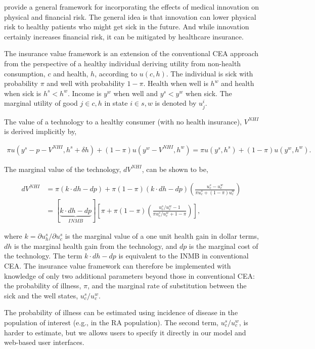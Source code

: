 \documentclass[11pt,final,fleqn]{article}\usepackage[]{graphicx}\usepackage[]{color}
\theoremstyle{plain}
\begin{document}
\citet{lakdawalla2017insurance} provide a general framework for incorporating the effects of medical innovation on physical and financial risk. The general idea is that innovation can lower physical risk to healthy patients who might get sick in the future. And while innovation certainly increases financial risk, it can be mitigated by healthcare insurance.  

The insurance value framework is an extension of the conventional CEA approach from the perspective of a healthy individual deriving utility from non-health consumption, $c$ and health, $h$, according to $u(c,h)$. The individual is sick with probability $\pi$ and well with probability $1-\pi$.  Health when well is $h^w$ and health when sick is $h^s < h^w$. Income is $y^w$ when well and $y^s <y^w$ when sick. The marginal utility of good $j \in {c,h}$ in state $i \in {s,w}$ is denoted by $u_j^i$. 

The value of a technology to a healthy consumer (with no health insurance), $V^{NHI}$ is derived implicitly by,

\begin{align}
\pi u(y^s - p - V^{NHI}, h^s + \delta h) + (1 - \pi)u\left(y^w - V^{NHI}, h^w \right) = 
\pi u(y^s, h^s) + (1-\pi) u(y^w, h^w).
\end{align}

The marginal value of the technology, $dV^{NHI}$, can be shown to be,

\begin{align}
dV^{NHI} &= \pi (k \cdot dh - dp) + \pi (1 - \pi)(k \cdot dh - dp)\left(\frac{u_c^s - u_c^w}{\pi u_c^s + (1-\pi)u_c^w} \right) \\
&= \left[\underbrace{k \cdot dh - dp}_{INMB}\right] \left[\pi + \pi (1 - \pi)\left(\frac{u_c^s/u_c^w - 1}{\pi u_c^s/u_c^w + 1 - \pi}\right)\right],
\end{align}

where $k = \partial u_h^s/\partial u_c^s$ is the marginal value of a one unit health gain in dollar terms, $dh$ is the marginal health gain from the technology, and $dp$ is the marginal cost of the technology. The term $k \cdot dh - dp$ is equivalent to the INMB in conventional CEA. The insurance value framework can therefore be implemented with knowledge of only two additional parameters beyond those in conventional CEA: the probability of illness, $\pi$, and the marginal rate of substitution between the sick and the well states, $u_c^s/u_c^w$. 

The probability of illness can be estimated using incidence of disease in the population of interest (e.g., in the RA population). The second term, $u_c^s/u_c^w$, is harder to estimate, but we allows users to specify it directly in our model and web-based user interfaces. 
\end{document}
